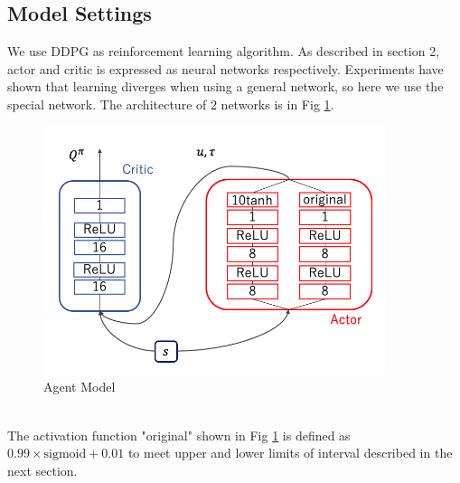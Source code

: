 \documentclass[english, dvipdfmx]{ampmt}             %
\def\numberofspines{1}
\begin{document}
\subsection{Model Settings}
We use DDPG as reinforcement learning algorithm. As described in section 2, actor and critic is expressed as neural networks respectively. Experiments have shown that learning diverges when using a general network, so here we use the special network. The architecture of 2 networks is in Fig \ref{NN}.
\begin{figure}[h]
	\centering
 	\includegraphics[width=10cm]{model.png}
 	\caption{Agent Model} \label{NN}
\end{figure}\\
The activation function "original" shown in Fig \ref{NN} is defined as $0.99 \times \textrm{sigmoid} + 0.01$ to meet upper and lower limits of interval described in the next section.\par

\fi
\ifoutputcover
\cleardoublepage
\makecover                      %
\makespine[\numberofspines]     %
\fi
\ifoutputabstractforsubmission
\makeabstractforsubmission      %
\fi
\end{document}
